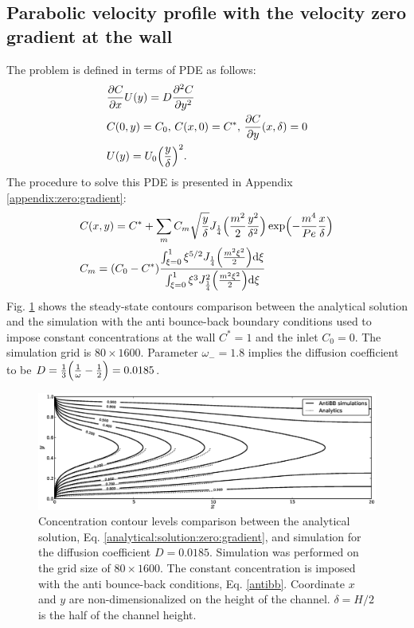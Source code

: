 \documentclass{article}
\newcommand{\beq}{\begin{equation}}
\newcommand{\feq}{\end{equation}}
\newcommand{\cstar}{C^{*}}
\newcommand{\omegaminus}{\omega_{-}}
\begin{document}
\subsection{Parabolic velocity profile with the velocity zero gradient at the wall}
The problem is defined in terms of PDE as follows: 
\beq
\begin{aligned}
&\frac{\partial C}{\partial x} U(y)=D\frac{\partial^2 C}{\partial y^2}\\
&C(0,y)=C_0,\, C(x,0)=\cstar,\, \frac{\partial C}{\partial y }(x,\delta)=0\\
&U(y)=U_0 \Bigl(\frac{y}{\delta}\Bigr)^2.
\end{aligned}
\feq
The procedure to solve this PDE is presented in Appendix \ref{appendix:zero:gradient}:
\beq
\label{analytical:solution:zero:gradient}
\begin{aligned}
&C(x,y)=\cstar+\sum_{m}{C_m
\sqrt{\frac{y}{\delta}}J_{\frac{1}{4}}\Bigl(\frac{m^2}{2}\frac{y^2}{\delta^2}\Bigr)\exp\Bigl(-\frac{
m^4 } { Pe }
\frac { x }{\delta}\Bigr)}\\
&C_m = (C_0-\cstar) \frac{\int_{\xi=0}^{1}{\xi^{5/2} J_{\frac{1}{4}}\Bigl(\frac{m^2
\xi^2}{2}\Bigr)\mathrm{d}\xi}}{\int_{\xi=0}^{1}{\xi^3 J_{\frac{1}{4}}^2\Bigl(\frac{m^2
\xi^2}{2}\Bigr)\mathrm{d}\xi}}
\end{aligned}
\feq
Fig. \ref{fig:parabolic:zero:gradient} shows the steady-state contours comparison between the
analytical solution and the simulation with the anti bounce-back boundary conditions used to impose constant
concentrations at the wall $\cstar=1$ and the inlet $C_0=0$. The simulation grid is
$80\times1600$. Parameter $\omegaminus=1.8$ implies the diffusion coefficient to be
$D=\frac{1}{3}\Bigl(\frac{1}{\omega}-\frac{1}{2}\Bigr)=0.0185$.  
\begin{figure}[htb!]
\includegraphics[width=\textwidth]{Figures/parabolic_profile_zero_gradient_comparison.eps}
\caption{Concentration contour levels comparison between the analytical solution, Eq.
\ref{analytical:solution:zero:gradient}, and simulation for the diffusion coefficient $D=0.0185$. Simulation was
performed on the grid size of $80\times 1600$. The constant concentration is imposed with the
anti bounce-back conditions, Eq. \ref{antibb}. Coordinate $x$ and $y$ are non-dimensionalized on
the height of the channel. $\delta=H/2$ is the half of the channel height.
\label{fig:parabolic:zero:gradient}}
\end{figure}
 
\end{document}
